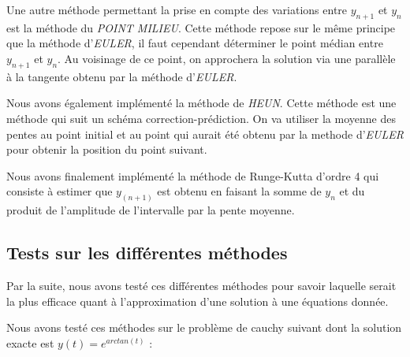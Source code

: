 Une autre méthode permettant la prise en compte des variations entre $y_{n+1}$ et $y_n $ est la méthode du \emph{POINT MILIEU}.
Cette méthode repose sur le même principe que la méthode d'\emph{EULER}, il faut cependant déterminer le point médian entre $y_{n+1}$ et $y_n$.
Au voisinage de ce point, on approchera la solution via une parallèle à la tangente obtenu par la méthode d'\emph{EULER}.


Nous avons également implémenté la méthode de \emph{HEUN}. Cette méthode est une méthode qui suit un schéma correction-prédiction. On va utiliser  la moyenne des pentes au point initial et au point qui aurait été obtenu par la methode d'\emph{EULER} pour obtenir la position du point suivant.


Nous avons finalement implémenté la méthode de Runge-Kutta d'ordre 4 qui consiste à estimer que $y_(n+1)$ est obtenu en faisant la somme de $y_n$ et du produit de l'amplitude de l'intervalle par la pente moyenne. 


\subsection {Tests sur les différentes méthodes}


Par la suite, nous avons testé ces différentes méthodes pour savoir laquelle serait la plus efficace quant à l'approximation d'une solution à une équations donnée.

Nous avons testé ces méthodes sur le problème de cauchy suivant dont la solution exacte est $y(t) = e^{arctan(t)}$ : 

